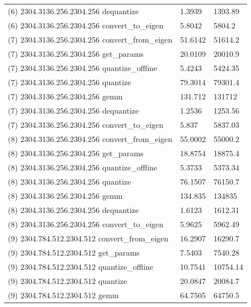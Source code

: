 \begin{longtable}{lll}
(6) 2304.3136.256.2304.256 dequantize            & 1.3939         & 1393.89          \\
(6) 2304.3136.256.2304.256 convert\_to\_eigen    & 5.8042         & 5804.2           \\
(7) 2304.3136.256.2304.256 convert\_from\_eigen  & 51.6142        & 51614.2          \\
(7) 2304.3136.256.2304.256 get\_params           & 20.0109        & 20010.9          \\
(7) 2304.3136.256.2304.256 quantize\_offline     & 5.4243         & 5424.35          \\
(7) 2304.3136.256.2304.256 quantize              & 79.3014        & 79301.4          \\
(7) 2304.3136.256.2304.256 gemm                  & 131.712        & 131712           \\
(7) 2304.3136.256.2304.256 dequantize            & 1.2536         & 1253.56          \\
(7) 2304.3136.256.2304.256 convert\_to\_eigen    & 5.837          & 5837.03          \\
(8) 2304.3136.256.2304.256 convert\_from\_eigen  & 55.0002        & 55000.2          \\
(8) 2304.3136.256.2304.256 get\_params           & 18.8754        & 18875.4          \\
(8) 2304.3136.256.2304.256 quantize\_offline     & 5.3733         & 5373.34          \\
(8) 2304.3136.256.2304.256 quantize              & 76.1507        & 76150.7          \\
(8) 2304.3136.256.2304.256 gemm                  & 134.835        & 134835           \\
(8) 2304.3136.256.2304.256 dequantize            & 1.6123         & 1612.31          \\
(8) 2304.3136.256.2304.256 convert\_to\_eigen    & 5.9625         & 5962.49          \\
(9) 2304.784.512.2304.512 convert\_from\_eigen   & 16.2907        & 16290.7          \\
(9) 2304.784.512.2304.512 get\_params            & 7.5403         & 7540.28          \\
(9) 2304.784.512.2304.512 quantize\_offline      & 10.7541        & 10754.14         \\
(9) 2304.784.512.2304.512 quantize               & 20.0847        & 20084.7          \\
(9) 2304.784.512.2304.512 gemm                   & 64.7505        & 64750.5          \\

\end{longtable}
